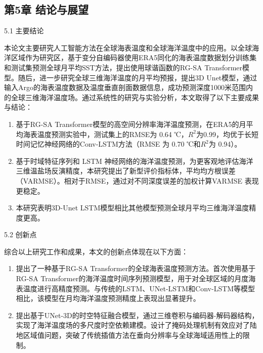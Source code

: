 \documentclass[
  12pt,
]{article}
\begin{document}
\subsection{第5章
结论与展望}\label{ux7b2c5ux7ae0-ux7ed3ux8bbaux4e0eux5c55ux671b}

\protect{}\label{_Toc1202164245}{}5.1 主要结论

本论文主要研究人工智能方法在全球海表温度和全球海洋温度中的应用。以全球海洋区域作为研究区，基于变分自编码器使用ERA5同化的海表温度数据划分训练集和测试集预测全球月平均SST方法，提出使用球谐函数的RG-SA
Transformer模型。随后，进一步研究全球三维海洋温度的月平均预报，提出3D
Unet模型，通过输入Argo的海表温度数据及温度垂直剖面数据信息，成功预测深度1000米范围内的全球三维海洋温度场。通过系统性的研究与实验分析，本文取得了以下主要成果与结论：

\begin{enumerate}
\def\labelenumi{\arabic{enumi}.}
\item
  基于RG-SA
  Transformer模型的高空间分辨率海洋温度预测，在ERA5的月平均海表温度预测实验中，测试集上的RMSE为
  0.64
  ℃，\(R^{2}\)为0.99，均优于长短时间记忆神经网络的Conv-LSTM方法（RMSE 为
  0.70 ℃和\(R^{2}\)为 0.94）。
\item
  基于时域特征序列和 LSTM
  神经网络的海洋温度预测，为更客观地评估海洋三维温盐场反演精度，本研究提出了新型评价指标体，平均均方根误差（VARMSE）。相对于RMSE，通过对不同深度误差的加权计算VARMSE
  表现更稳定。
\item
  本研究表明3D-Unet
  LSTM模型相比其他模型预测全球月平均三维海洋温度精度更高。
\end{enumerate}

\protect{}\label{_Toc1248314739}{}5.2 创新点

综合以上研究工作和成果，本文的创新点体现在以下方面：

\begin{enumerate}
\def\labelenumi{\arabic{enumi}.}
\item
  提出了一种基于RG-SA
  Transformer的全球海表温度预测方法。首次使用基于RG-SA
  Transformer的海洋温度时间序列预测模型，用于对全球区域的月度海表温度进行高精度预测。与传统的LSTM、UNet-LSTM和Conv-LSTM等模型相比，该模型在月均海洋温度预测精度上表现出显著提升。
\item
  提出基于UNet-3D的时空特征融合模型，通过三维卷积与编码器-解码器结构，实现了海洋温度场的多尺度时空依赖建模。设计了掩码处理机制有效应对了陆地区域值问题，突破了传统插值方法在垂向分辨率与全球海域适用性上的限制。
\end{enumerate}
\end{document}
